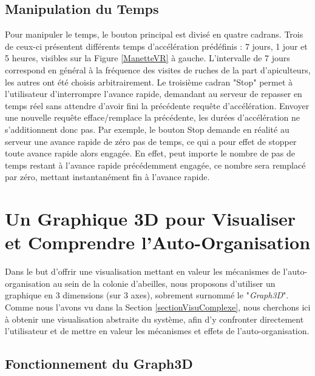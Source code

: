 		\subsection{Manipulation du Temps}
		
		Pour manipuler le temps, le bouton principal est divisé en quatre cadrans. Trois de ceux-ci présentent différents temps d'accélération prédéfinis : 7 jours, 1 jour et 5 heures, visibles sur la Figure \ref{ManetteVR} à gauche. L'intervalle de 7 jours correspond en général à la fréquence des visites de ruches de la part d'apiculteurs, les autres ont été choisis arbitrairement. Le troisième cadran "Stop" permet à l'utilisateur d'interrompre l'avance rapide, demandant au serveur de repasser en temps réel sans attendre d'avoir fini la précédente requête d'accélération. Envoyer une nouvelle requête efface/remplace la précédente, les durées d'accélération ne s'additionnent donc pas. Par exemple, le bouton Stop demande en réalité au serveur une avance rapide de zéro pas de temps, ce qui a pour effet de stopper toute avance rapide alors engagée. En effet, peut importe le nombre de pas de temps restant à l'avance rapide précédemment engagée, ce nombre sera remplacé par zéro, mettant instantanément fin à l'avance rapide.
		
	\section{Un Graphique 3D pour Visualiser et Comprendre l'Auto-Organisation}
	\label{Manip3D}
		Dans le but d'offrir une visualisation mettant en valeur les mécanismes de l'auto-organisation au sein de la colonie d'abeilles, nous proposons d'utiliser un graphique en 3 dimensions (sur 3 axes), sobrement surnommé le "\textit{Graph3D}". Comme nous l'avons vu dans la Section \ref{sectionVisuComplexe}, nous cherchons ici à obtenir une visualisation abstraite du système, afin d'y confronter directement l'utilisateur et de mettre en valeur les mécanismes et effets de l'auto-organisation.
		
		\subsection{Fonctionnement du Graph3D}
		
